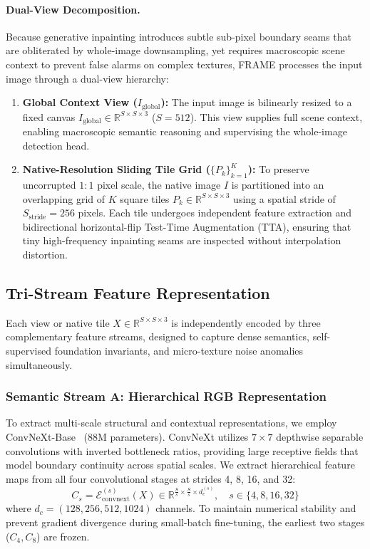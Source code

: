 \paragraph{Dual-View Decomposition.} Because generative inpainting introduces subtle sub-pixel boundary seams that are obliterated by whole-image downsampling, yet requires macroscopic scene context to prevent false alarms on complex textures, FRAME processes the input image through a dual-view hierarchy:
\begin{enumerate}
    \item \textbf{Global Context View ($I_{\mathrm{global}}$):} The input image is bilinearly resized to a fixed canvas $I_{\mathrm{global}} \in \mathbb{R}^{S \times S \times 3}$ ($S = 512$). This view supplies full scene context, enabling macroscopic semantic reasoning and supervising the whole-image detection head.
    \item \textbf{Native-Resolution Sliding Tile Grid ($\{P_k\}_{k=1}^K$):} To preserve uncorrupted $1:1$ pixel scale, the native image $I$ is partitioned into an overlapping grid of $K$ square tiles $P_k \in \mathbb{R}^{S \times S \times 3}$ using a spatial stride of $S_{\mathrm{stride}} = 256$ pixels. Each tile undergoes independent feature extraction and bidirectional horizontal-flip Test-Time Augmentation (TTA), ensuring that tiny high-frequency inpainting seams are inspected without interpolation distortion.
\end{enumerate}

\subsection{Tri-Stream Feature Representation}
Each view or native tile $X \in \mathbb{R}^{S \times S \times 3}$ is independently encoded by three complementary feature streams, designed to capture dense semantics, self-supervised foundation invariants, and micro-texture noise anomalies simultaneously.

\subsubsection{Semantic Stream A: Hierarchical RGB Representation}
To extract multi-scale structural and contextual representations, we employ ConvNeXt-Base~\cite{convnext} (88M parameters). ConvNeXt utilizes $7 \times 7$ depthwise separable convolutions with inverted bottleneck ratios, providing large receptive fields that model boundary continuity across spatial scales. We extract hierarchical feature maps from all four convolutional stages at strides 4, 8, 16, and 32:
\begin{equation}
    C_s = \mathcal{E}_{\mathrm{convnext}}^{(s)}(X) \in \mathbb{R}^{\frac{S}{s} \times \frac{S}{s} \times d_c^{(s)}}, \quad s \in \{4, 8, 16, 32\}
\end{equation}
where $d_c = (128, 256, 512, 1024)$ channels. To maintain numerical stability and prevent gradient divergence during small-batch fine-tuning, the earliest two stages ($C_4, C_8$) are frozen.

